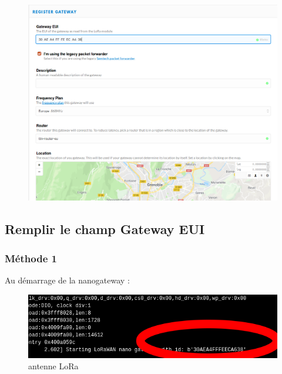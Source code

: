\documentclass{article}
\begin{document}
\begin{figure}[H]
\begin{center}
\advance\leftskip-3cm
\advance\rightskip-3cm
\includegraphics[keepaspectratio=true,scale=0.3]{register_gateway.png}
\label{visina8}
\end{center}\end{figure}


\subsection{Remplir le champ Gateway EUI}




\subsubsection{Méthode 1}
Au démarrage de la nanogateway :
 \begin{figure}[H]
\begin{center}
\advance\leftskip-3cm
\advance\rightskip-3cm
\includegraphics[keepaspectratio=true,scale=0.4]{gateway_id_atom.png}
\caption{antenne LoRa}
\label{visina8}
\end{center}\end{figure}
 
\end{document}
